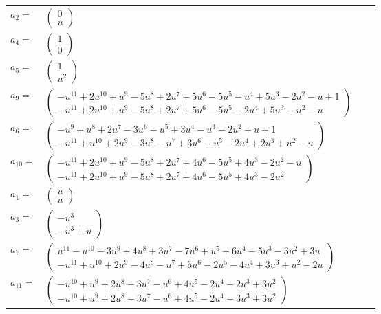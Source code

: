 \documentclass[1p]{elsarticle_modified}
\theoremstyle{definition}
\begin{document}
\begin{tabular}{m{7pt} m{180pt} m{7pt} m{180pt} }
\flushright $a_{2}=$&$\begin{pmatrix}0\\u\end{pmatrix}$ \\
\flushright $a_{4}=$&$\begin{pmatrix}1\\0\end{pmatrix}$ \\
\flushright $a_{5}=$&$\begin{pmatrix}1\\u^2\end{pmatrix}$ \\
\flushright $a_{9}=$&$\begin{pmatrix}- u^{11}+2 u^{10}+u^9-5 u^8+2 u^7+5 u^6-5 u^5- u^4+5 u^3-2 u^2- u+1\\- u^{11}+2 u^{10}+u^9-5 u^8+2 u^7+5 u^6-5 u^5-2 u^4+5 u^3- u^2- u\end{pmatrix}$ \\
\flushright $a_{6}=$&$\begin{pmatrix}- u^9+u^8+2 u^7-3 u^6- u^5+3 u^4- u^3-2 u^2+u+1\\- u^{11}+u^{10}+2 u^9-3 u^8- u^7+3 u^6- u^5-2 u^4+2 u^3+u^2- u\end{pmatrix}$ \\
\flushright $a_{10}=$&$\begin{pmatrix}- u^{11}+2 u^{10}+u^9-5 u^8+2 u^7+4 u^6-5 u^5+4 u^3-2 u^2- u\\- u^{11}+2 u^{10}+u^9-5 u^8+2 u^7+4 u^6-5 u^5+4 u^3-2 u^2\end{pmatrix}$ \\
\flushright $a_{1}=$&$\begin{pmatrix}u\\u\end{pmatrix}$ \\
\flushright $a_{3}=$&$\begin{pmatrix}- u^3\\- u^3+u\end{pmatrix}$ \\
\flushright $a_{7}=$&$\begin{pmatrix}u^{11}- u^{10}-3 u^9+4 u^8+3 u^7-7 u^6+u^5+6 u^4-5 u^3-3 u^2+3 u\\- u^{11}+u^{10}+2 u^9-4 u^8- u^7+5 u^6-2 u^5-4 u^4+3 u^3+u^2-2 u\end{pmatrix}$ \\
\flushright $a_{11}=$&$\begin{pmatrix}- u^{10}+u^9+2 u^8-3 u^7- u^6+4 u^5-2 u^4-2 u^3+3 u^2\\- u^{10}+u^9+2 u^8-3 u^7- u^6+4 u^5-2 u^4-3 u^3+3 u^2\end{pmatrix}$ \\

\end{tabular}
\end{document}
